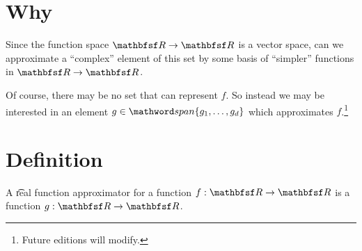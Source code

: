 
\section*{Why}

Since the function space $\R  \to \R $ is a vector space, can we approximate a ``complex'' element of this set by some basis of ``simpler'' functions in $\R  \to \R $.

Of course, there may be no set that can represent $f$.
So instead we may be interested in an element $g \in \span\set{g_1, \dots , g_d}$ which approximates $f$.\footnote{Future editions will modify.}

\section*{Definition}

A \t{real function approximator} for a function $f: \R  \to \R $ is a function $g: \R  \to \R $.

\blankpage